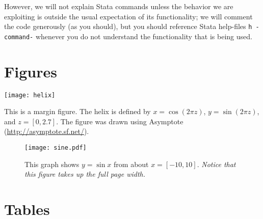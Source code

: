 However, we will not explain Stata commands unless the behavior we are exploiting
is outside the usual expectation of its functionality;
we will comment the code generously (as you should),
but you should reference Stata help-files \texttt{h -command-}
whenever you do not understand the functionality that is being used.


\section{Figures}

\lipsum[1]

\begin{marginfigure}
\texttt{[image: helix]}
\caption{This is a margin figure. The helix is defined by $x = \cos(2\pi z)$, $y = \sin(2\pi z)$, and $z = [0, 2.7]$. The figure was drawn using Asymptote (\url{http://asymptote.sf.net/}).}
\label{fig:marginfig}
\end{marginfigure}

\lipsum[2]

\begin{figure*}[h]
\texttt{[image: sine.pdf]}
\caption{This graph shows $y = \sin x$ from about $x = [-10, 10]$.
\emph{Notice that this figure takes up the full page width.}}
\label{fig:fullfig}
\end{figure*}

\lipsum[3]


\section{Tables} 

\lipsum[4]

